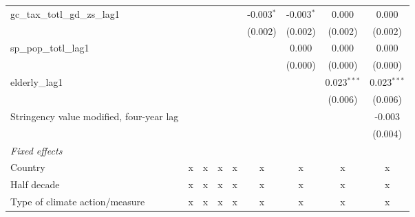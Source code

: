 \begin{tabular}{lcccccccc}
   gc\_tax\_totl\_gd\_zs\_lag1                                &                &                &                &                & -0.003$^{*}$  & -0.003$^{*}$  & 0.000         & 0.000\\   
                                                              &                &                &                &                & (0.002)       & (0.002)       & (0.002)       & (0.002)\\   
   sp\_pop\_totl\_lag1                                        &                &                &                &                &               & 0.000         & 0.000         & 0.000\\   
                                                              &                &                &                &                &               & (0.000)       & (0.000)       & (0.000)\\   
   elderly\_lag1                                              &                &                &                &                &               &               & 0.023$^{***}$ & 0.023$^{***}$\\   
                                                              &                &                &                &                &               &               & (0.006)       & (0.006)\\   
   Stringency value modified, four-year lag                   &                &                &                &                &               &               &               & -0.003\\   
                                                              &                &                &                &                &               &               &               & (0.004)\\   
   \emph{Fixed effects}\\
   Country                                                    & x              & x              & x              & x              & x             & x             & x             & x\\  
   Half decade                                                & x              & x              & x              & x              & x             & x             & x             & x\\  
   Type of climate action/measure                             & x              & x              & x              & x              & x             & x             & x             & x\\  

\end{tabular}
